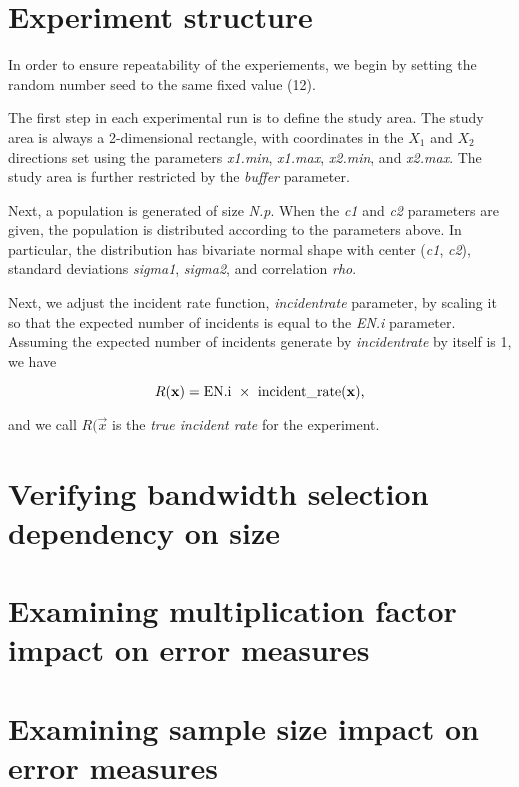 \section{Experiment structure}
\label{sec:method:experiment_structure}

In order to ensure repeatability of the experiements, we begin by setting the random number seed to the same fixed value (12).

The first step in each experimental run is to define the study area. 
The study area is always a 2-dimensional rectangle, with coordinates in the \(X_1\) and \(X_2\) directions set using the parameters \textit{x1.min}, \textit{x1.max}, \textit{x2.min}, and \textit{x2.max}.
The study area is further restricted by the \textit{buffer} parameter.

Next, a population is generated of size \textit{N.p}.
When the \textit{c1} and \textit{c2} parameters are given, the population is distributed according to the parameters above.
In particular, the distribution has bivariate normal shape with center (\textit{c1}, \textit{c2}),
standard deviations \textit{sigma1}, \textit{sigma2}, and correlation \textit{rho}.

Next, we adjust the incident rate function, \textit{incident\textunderscore rate} parameter, by scaling it so that the expected number of incidents is equal to the \textit{EN.i} parameter.
Assuming the expected number of incidents generate by \textit{incident\textunderscore rate} by itself is 1, we have

\[
    R(\vec{x}) = \mbox{EN.i}~\times~\mbox{incident\textunderscore rate}(\vec{x}) \text{,}
\]

and we call \(R(\vec{x}\) is the \textit{true incident rate} for the experiment.

\section{Verifying bandwidth selection dependency on size}

\section{Examining multiplication factor impact on error measures}

\section{Examining sample size impact on error measures}

